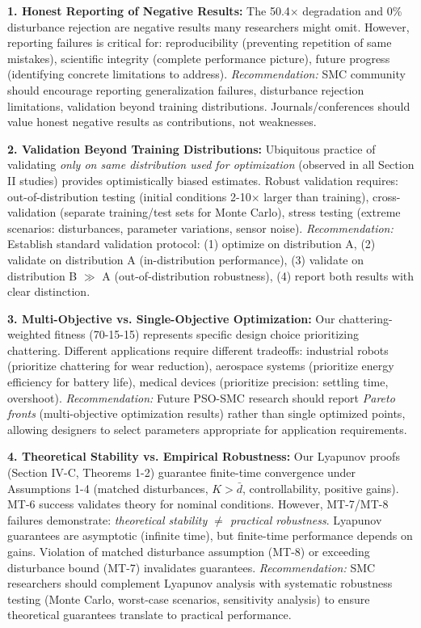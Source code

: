 \documentclass[conference]{IEEEtran}
\begin{document}
\textbf{1. Honest Reporting of Negative Results:} The 50.4$\times$ degradation and 0\% disturbance rejection are negative results many researchers might omit. However, reporting failures is critical for: reproducibility (preventing repetition of same mistakes), scientific integrity (complete performance picture), future progress (identifying concrete limitations to address). \emph{Recommendation:} SMC community should encourage reporting generalization failures, disturbance rejection limitations, validation beyond training distributions. Journals/conferences should value honest negative results as contributions, not weaknesses.

\textbf{2. Validation Beyond Training Distributions:} Ubiquitous practice of validating \emph{only on same distribution used for optimization} (observed in all Section II studies) provides optimistically biased estimates. Robust validation requires: out-of-distribution testing (initial conditions 2-10$\times$ larger than training), cross-validation (separate training/test sets for Monte Carlo), stress testing (extreme scenarios: disturbances, parameter variations, sensor noise). \emph{Recommendation:} Establish standard validation protocol: (1) optimize on distribution A, (2) validate on distribution A (in-distribution performance), (3) validate on distribution B $\gg$ A (out-of-distribution robustness), (4) report both results with clear distinction.

\textbf{3. Multi-Objective vs. Single-Objective Optimization:} Our chattering-weighted fitness (70-15-15) represents specific design choice prioritizing chattering. Different applications require different tradeoffs: industrial robots (prioritize chattering for wear reduction), aerospace systems (prioritize energy efficiency for battery life), medical devices (prioritize precision: settling time, overshoot). \emph{Recommendation:} Future PSO-SMC research should report \emph{Pareto fronts} (multi-objective optimization results) rather than single optimized points, allowing designers to select parameters appropriate for application requirements.

\textbf{4. Theoretical Stability vs. Empirical Robustness:} Our Lyapunov proofs (Section IV-C, Theorems 1-2) guarantee finite-time convergence under Assumptions 1-4 (matched disturbances, $K > \bar{d}$, controllability, positive gains). MT-6 success validates theory for nominal conditions. However, MT-7/MT-8 failures demonstrate: \emph{theoretical stability $\neq$ practical robustness}. Lyapunov guarantees are asymptotic (infinite time), but finite-time performance depends on gains. Violation of matched disturbance assumption (MT-8) or exceeding disturbance bound (MT-7) invalidates guarantees. \emph{Recommendation:} SMC researchers should complement Lyapunov analysis with systematic robustness testing (Monte Carlo, worst-case scenarios, sensitivity analysis) to ensure theoretical guarantees translate to practical performance.
\end{document}
